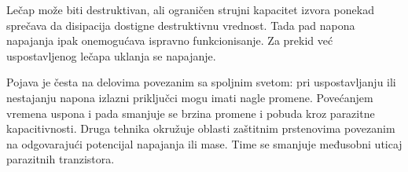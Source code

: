 Lečap može biti destruktivan, ali ograničen strujni kapacitet izvora ponekad sprečava da disipacija dostigne destruktivnu vrednost. Tada pad napona napajanja ipak onemogućava ispravno funkcionisanje. Za prekid već uspostavljenog lečapa uklanja se napajanje.

Pojava je česta na delovima povezanim sa spoljnim svetom: pri uspostavljanju ili nestajanju napona izlazni priključci mogu imati nagle promene. Povećanjem vremena uspona i pada smanjuje se brzina promene i pobuda kroz parazitne kapacitivnosti. Druga tehnika okružuje oblasti zaštitnim prstenovima povezanim na odgovarajući potencijal napajanja ili mase. Time se smanjuje međusobni uticaj parazitnih tranzistora.
